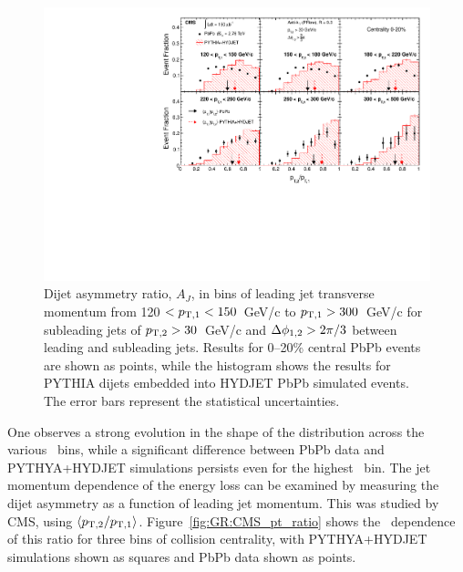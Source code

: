 \begin{figure}[!h]
\begin{center}
\includegraphics[width=0.49\mboxwidth]{jetfigures/dijet_imbalance5_0to20_pt_20120103_subt.pdf}
\caption{Dijet asymmetry ratio, $A_{J}$, in bins of leading jet transverse momentum from
120 $ < p_{\rm{T},1} < 150$~GeV/c to $p_{\rm{T},1} > 300$~GeV/c for
  subleading jets of $p_{\rm{T},2}> 30$~GeV/c
and $\Delta\phi_{1,2}>2\pi/3$ between leading and subleading jets.
Results for 0--20\% central PbPb events are shown as points, while the histogram
shows the results for
PYTHIA dijets embedded into HYDJET PbPb simulated events. The error bars represent the statistical uncertainties.}
\label{fig:GR:CMS_dijet_pt}
\end{center}
\end{figure}
One observes a strong evolution in the shape of the distribution across the
various \pt\ bins, while a significant difference between PbPb data and 
PYTHYA+HYDJET simulations persists even for the highest \pT\ bin. 
The jet momentum dependence of the energy loss can be examined by measuring the
dijet asymmetry as a function of leading jet momentum. This was studied by CMS,
using $\langle p_{\rm{T},2}/p_{\rm{T},1} \rangle$. Figure~\ref{fig:GR:CMS_pt_ratio} 
shows the \pT\ dependence of this ratio for three 
bins of collision centrality, with PYTHYA+HYDJET simulations shown 
as squares and PbPb data shown as points. 

